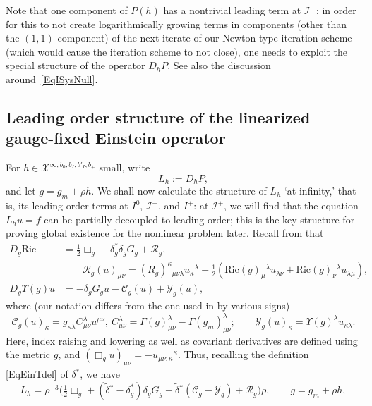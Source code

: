 \documentclass[reqno,11pt,letterpaper]{amsart}
\numberwithin{equation}{section}
\numberwithin{figure}{section}
\theoremstyle{definition}
\theoremstyle{remark}
\newcommand{\mc}{\mathcal}
\newcommand{\cX}{\mc X}
\newcommand{\ms}{\mathscr}
\newcommand{\sC}{\ms C}
\newcommand{\scri}{\ms I}
\newcommand{\sR}{\ms R}
\newcommand{\sY}{\ms Y}
\newcommand{\Ups}{\Upsilon}
\newcommand{\wt}{\widetilde}
\newcommand{\half}{\tfrac{1}{2}}
\newcommand{\tdel}{\wt{\delta}{}}
\newcommand{\Ric}{\mathrm{Ric}}
\begin{document}
Note that one component of $P(h)$ has a nontrivial leading term at $\scri^+$; in order for this to not create logarithmically growing terms in components (other than the $(1,1)$ component) of the next iterate of our Newton-type iteration scheme (which would cause the iteration scheme to not close), one needs to exploit the special structure of the operator $D_h P$. See also the discussion around~\eqref{EqISysNull}.



\subsection{Leading order structure of the linearized gauge-fixed Einstein operator}
\label{SsEinN}

For $h\in\cX^{\infty;b_0,b_I,b'_I,b_+}$ small, write
\begin{equation}
\label{EqEinNLin}
  L_h:=D_h P,
\end{equation}
and let $g=g_m+\rho h$. We shall now calculate the structure of $L_h$ `at infinity,' that is, its leading order terms at $I^0$, $\scri^+$, and $I^+$: at $\scri^+$, we will find that the equation $L_h u=f$ can be partially decoupled to leading order; this is the key structure for proving global existence for the nonlinear problem later. Recall from \cite{GrahamLeeConformalEinstein} that 
\begin{equation}
\label{EqEinNOp0}
\begin{split}
  D_g\Ric &= \half\Box_g - \delta_g^*\delta_g G_g + \sR_g, \\
    &\qquad \sR_g(u)_{\mu\nu}=(R_g)^\kappa{}_{\mu\nu\lambda}u_\kappa{}^\lambda + \half(\Ric(g)_\mu{}^\lambda u_{\lambda\nu}+\Ric(g)_\nu{}^\lambda u_{\lambda\mu}), \\
  D_g\Ups(g)u &= -\delta_g G_g u - \sC_g(u)+\sY_g(u),
\end{split}
\end{equation}
where (our notation differs from the one used in \cite{GrahamLeeConformalEinstein} by various signs)
\[
  \sC_g(u)_\kappa = g_{\kappa\lambda}C^\lambda_{\mu\nu}u^{\mu\nu},\ C^\lambda_{\mu\nu}=\Gamma(g)^\lambda_{\mu\nu}-\Gamma(g_m)^\lambda_{\mu\nu}; \qquad
  \sY_g(u)_\kappa = \Ups(g)^\lambda u_{\kappa\lambda}.
\]
Here, index raising and lowering as well as covariant derivatives are defined using the metric $g$, and $(\Box_g u)_{\mu\nu}=-u_{\mu\nu;\kappa}{}^\kappa$. Thus, recalling the definition \eqref{EqEinTdel} of $\tdel^*$, we have
\begin{equation}
\label{EqEinNOp}
  L_h = \rho^{-3}\bigl(\half\Box_g + (\tdel^*-\delta_g^*)\delta_g G_g + \tdel^*(\sC_g-\sY_g) + \sR_g\bigr)\rho,\qquad g=g_m+\rho h,
\end{equation}
\end{document}
